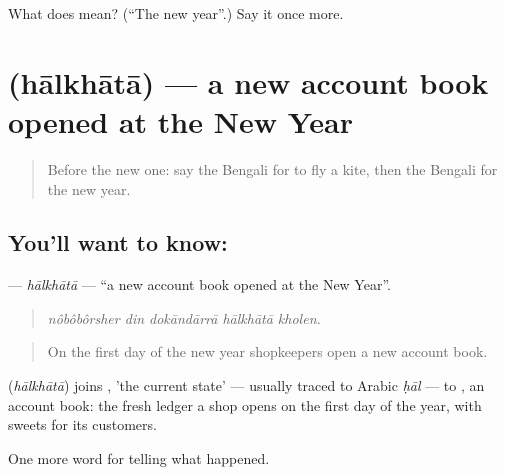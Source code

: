 \begin{tcolorbox}[breakable,colback=teal!4,colframe=teal!35!black,title={Before you move on}]
What does  mean? (\textquotedblleft{}The new year\textquotedblright{}.) Say it once more.
\end{tcolorbox}
\section[\texorpdfstring{\bn{হালখাতা} (hālkhātā)}{হালখাতা (hālkhātā)}]{ (hālkhātā) — a new account book opened at the New Year}

\label{lesson:BN-C309-halkhata}



\begin{quote}
Before the new one: say the Bengali for to fly a kite, then the Bengali for the new year.
\end{quote}

\subsection*{You'll want to know: }
\textbf{} — \emph{hālkhātā} — \textquotedblleft{}a new account book opened at the New Year\textquotedblright{}.

\begin{quote}
    
\end{quote}

\begin{quote}
\emph{nôbôbôrsher din dokāndārrā hālkhātā kholen.}
\end{quote}

\begin{quote}
On the first day of the new year shopkeepers open a new account book.
\end{quote}

\begin{cousinweb}
\textbf{} (\emph{hālkhātā}) joins , 'the current state' — usually traced to Arabic \emph{ḥāl} — to \textbf{}, an account book: the fresh ledger a shop opens on the first day of the year, with sweets for its customers.
\end{cousinweb}

\begin{grammarlens}[title={What you've built}]
One more word for telling what happened.
\end{grammarlens}

